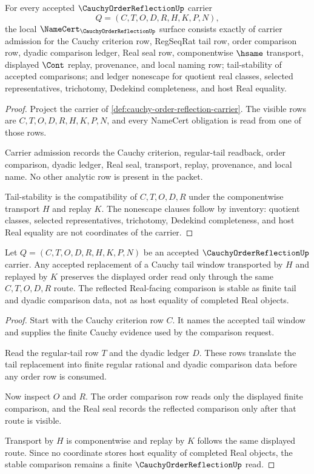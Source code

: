 \begin{theorem}
\label{thm:cauchy-order-reflection-namecert-obligations}
For every accepted $\CauchyOrderReflectionUp$ carrier
$$
Q=(C,T,O,D,R,H,K,P,N),
$$
the local $\NameCert_{\CauchyOrderReflectionUp}$ surface consists exactly of carrier admission for the Cauchy criterion row, RegSeqRat tail row, order comparison row, dyadic comparison ledger, Real seal row, componentwise $\hsame$ transport, displayed $\Cont$ replay, provenance, and local naming row; tail-stability of accepted comparisons; and ledger nonescape for quotient real classes, selected representatives, trichotomy, Dedekind completeness, and host Real equality.
\end{theorem}
\begin{proof}
Project the carrier of \autoref{def:cauchy-order-reflection-carrier}. The visible rows are $C,T,O,D,R,H,K,P,N$, and every NameCert obligation is read from one of those rows.

Carrier admission records the Cauchy criterion, regular-tail readback, order comparison, dyadic ledger, Real seal, transport, replay, provenance, and local name. No other analytic row is present in the packet.

Tail-stability is the compatibility of $C,T,O,D,R$ under the componentwise transport $H$ and replay $K$. The nonescape clauses follow by inventory: quotient classes, selected representatives, trichotomy, Dedekind completeness, and host Real equality are not coordinates of the carrier.
\end{proof}

\begin{theorem}
\label{thm:cauchy-order-reflection-tail-stability}
Let $Q=(C,T,O,D,R,H,K,P,N)$ be an accepted $\CauchyOrderReflectionUp$ carrier. Any accepted replacement of a Cauchy tail window transported by $H$ and replayed by $K$ preserves the displayed order read only through the same $C,T,O,D,R$ route. The reflected Real-facing comparison is stable as finite tail and dyadic comparison data, not as host equality of completed Real objects.
\end{theorem}
\begin{proof}
Start with the Cauchy criterion row $C$. It names the accepted tail window and supplies the finite Cauchy evidence used by the comparison request.

Read the regular-tail row $T$ and the dyadic ledger $D$. These rows translate the tail replacement into finite regular rational and dyadic comparison data before any order row is consumed.

Now inspect $O$ and $R$. The order comparison row reads only the displayed finite comparison, and the Real seal records the reflected comparison only after that route is visible.

Transport by $H$ is componentwise and replay by $K$ follows the same displayed route. Since no coordinate stores host equality of completed Real objects, the stable comparison remains a finite $\CauchyOrderReflectionUp$ read.
\end{proof}


